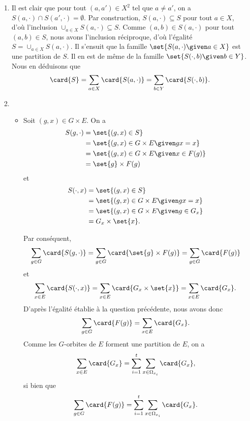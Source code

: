 \begin{enumerate}
  \item
    Il est clair que pour tout $(a,a')\in X^2$ tel que $a\neq a'$, on a $S(a,\cdot) \cap S(a',\cdot) = \emptyset$.
    Par construction, $S(a,\cdot) \subseteq S$ pour tout $a\in X$, d'où l'inclusion $\cup_{a\in X} S(a,\cdot) \subseteq S$.
    Comme $(a,b)\in S(a,\cdot)$ pour tout $(a,b)\in S$, nous avons l'inclusion réciproque, d'où l'égalité $S = \cup_{a\in X} S(a,\cdot)$.
    Il s'ensuit que la famille $\set{S(a,\cdot) \given a\in X}$ est une partition de $S$.
    Il en est de même de la famille $\set{S(\cdot,b) \given b\in Y}$.
    Nous en déduisons que
    \[
      \card{S} = \sum_{a\in X} \card{S(a,\cdot)} = \sum_{b\in Y} \card{S(\cdot,b)}.
    \]

  \item
    \begin{itemize}
      \item
        Soit $(g,x)\in G\times E$.
        On a
        \begin{align*}
          S(g,\cdot) &= \set{(g,x)\in S} \\
                     &= \set{(g,x)\in G\times E \given gx = x} \\
                     &= \set{(g,x)\in G\times E \given x\in F(g) } \\
                     &= \set{g}\times F(g)
        \end{align*}
        et
        \begin{align*}
          S(\cdot,x) &= \set{(g,x)\in S} \\
                     &= \set{(g,x)\in G\times E \given gx = x} \\
                     &= \set{(g,x)\in G\times E \given g\in G_x } \\
                     &= G_x\times\set{x}.
        \end{align*}

        Par conséquent,
        \[
          \sum_{g\in G} \card{S(g,\cdot)}
            = \sum_{g\in G} \card{\set{g}\times F(g)}
            = \sum_{g\in G} \card{F(g)}
        \]
        et
        \[
          \sum_{x\in E} \card{S(\cdot,x)}
            = \sum_{x\in E} \card{G_x\times\set{x}}
            = \sum_{x\in E} \card{G_x}.
        \]
        D'après l'égalité établie à la question précédente, nous avons donc
        \[
          \sum_{g\in G} \card{F(g)} = \sum_{x\in E} \card{G_x}.
        \]
        Comme les $G$-orbites de $E$ forment une partition de $E$, on a
        \[
          \sum_{x\in E} \card{G_x} = \sum_{i = 1}^t \sum_{x\in\Omega_{x_i}} \card{G_x},
        \]
        si bien que
        \[
          \sum_{g\in G} \card{F(g)} = \sum_{i = 1}^t \sum_{x\in\Omega_{x_i}} \card{G_x}.
        \]


\end{itemize}
\end{enumerate}
